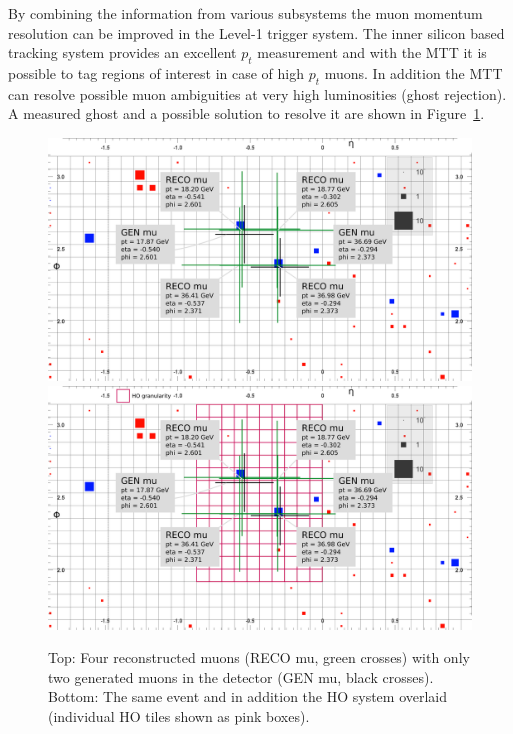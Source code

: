 By combining the information from various subsystems the muon momentum resolution can be improved in the Level-1 trigger system. The inner silicon based tracking system provides 
an excellent $p_t$ measurement and with the MTT it is possible to tag regions of interest in case of high $p_t$ muons. In addition the MTT can resolve possible muon 
ambiguities at very high luminosities (ghost rejection). A measured ghost and a possible solution to resolve it are shown in Figure~\ref{fig:ghosts}.
\begin{figure}[htbp]
\centering
\includegraphics[width=\textwidth]{Figures/pooth/GhostEvent01.png}
\includegraphics[width=\textwidth]{Figures/pooth/GhostEvent02.png}
\caption{Top: Four reconstructed muons (RECO mu, green crosses) with only two generated muons in the detector (GEN mu, black crosses). 
Bottom: The same event and in addition the HO system overlaid (individual HO tiles shown as pink boxes).} 
\label{fig:ghosts}
\end{figure}